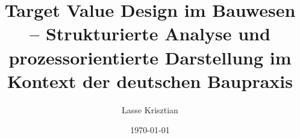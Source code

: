 \title{Target Value Design im Bauwesen -- Strukturierte Analyse und prozessorientierte Darstellung im Kontext der deutschen Baupraxis}
\author{Lasse Krisztian}
\date{\today}

\newcommand{\matrikelnummer}{184406}
\newcommand{\emailadresse}{lasse.krisztian@tu-dortmund.de}

\newcommand{\universitaet}{Technische Universität Dortmund}
\newcommand{\fakultaet}{Fakultät für Architektur und Bauingenieurwesen}
\newcommand{\lehrstuhl}{Lehrstuhl Baubetrieb und Bauprozessmanagement}
\newcommand{\studiengang}{Bauingenieurwesen Vertiefung Baubetrieb}
\newcommand{\abschluss}{Master of Science (M.Sc.)}

\newcommand{\professor}{Univ.-Prof. Dr.-Ing. Mike Gralla}
\newcommand{\erstbetreuer}{Franziska Blennemann, M.Sc.}
\newcommand{\zweitbetreuer}{Dipl.-Ing. Tim Brandt}

\newcommand{\abgabedatum}{12. Januar 2026}
\newcommand{\bearbeitungszeitraum}{Juli 2025 -- Januar 2026}

\newcommand{\themabereich}{Target Value Design}
\newcommand{\untertitel}{Eine Analyse moderner Kostensteuerungsmethoden im Bauwesen}
\newcommand{\schlagwoerter}{Target Value Design, Lean Construction, Integrated Project Delivery, Bauwirtschaft}

